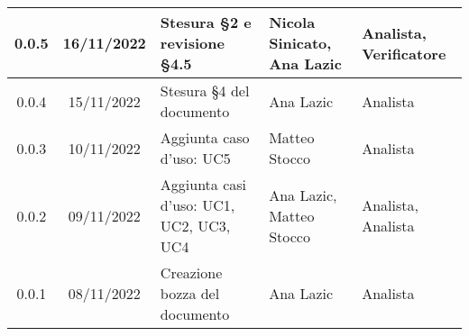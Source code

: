 \begin{center}
\begin{tabularx}{\textwidth}{| c | c | X | X | X |}
	\hline
	0.0.5 & 16/11/2022	 & Stesura §2 e revisione §4.5 & Nicola Sinicato, Ana Lazic & Analista, Verificatore\\
	\hline
	0.0.4 & 15/11/2022	 & Stesura §4 del documento & Ana Lazic & Analista\\
	\hline
	0.0.3 & 10/11/2022 & Aggiunta caso d’uso: UC5 & Matteo Stocco & Analista\\
	\hline
	0.0.2 & 09/11/2022	 & Aggiunta casi d’uso: UC1, UC2, UC3, UC4 & Ana Lazic, Matteo Stocco & Analista, Analista\\
	\hline
	0.0.1 & 08/11/2022 & Creazione bozza del documento & Ana Lazic & Analista\\
	\hline
\end{tabularx}		
\end{center}
